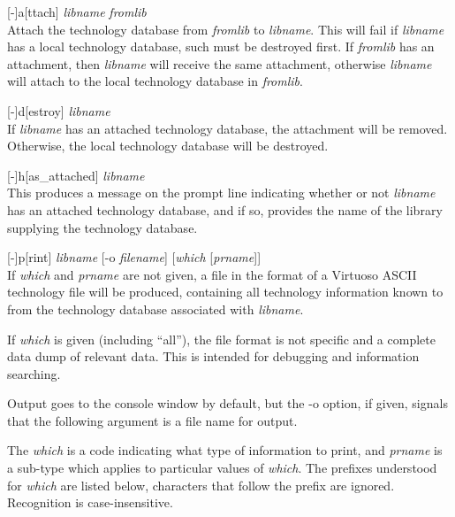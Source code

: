 \begin{description}
\item{[-]{\vt a}[{\vt ttach}] {\it libname} {\it fromlib}}\\
Attach the technology database from {\it fromlib} to {\it libname}. 
This will fail if {\it libname} has a local technology database, such
must be destroyed first.  If {\it fromlib} has an attachment, then
{\it libname} will receive the same attachment, otherwise {\it
libname} will attach to the local technology database in {\it
fromlib}.

\item{[-]{\vt d}[{\vt estroy}] {\it libname}}\\
If {\it libname} has an attached technology database, the attachment
will be removed.  Otherwise, the local technology database will be
destroyed.

\item{[-]{\vt h}[{\vt as\_attached}] {\it libname}}\\
This produces a message on the prompt line indicating whether or not
{\it libname} has an attached technology database, and if so, provides
the name of the library supplying the technology database.

\item{[-]{\vt p}[{\vt rint}] {\it libname} [{\vt -o} {\it filename\/}]
  [{\it which} [{\it prname\/}]]}\\
If {\it which} and {\it prname} are not given, a file in the format of
a Virtuoso ASCII technology file will be produced, containing all
technology information known to {\Xic} from the technology database
associated with {\it libname}. 

If {\it which} is given (including ``{\vt all}''), the file format is
not specific and a complete data dump of relevant data.  This is
intended for debugging and information searching.

Output goes to the console window by default, but the {\vt -o} option,
if given, signals that the following argument is a file name for
output.

The {\it which} is a code indicating what type of information to
print, and {\it prname} is a sub-type which applies to particular
values of {\it which}.  The prefixes understood for {\it which} are
listed below, characters that follow the prefix are ignored. 
Recognition is case-insensitive.


\end{description}
